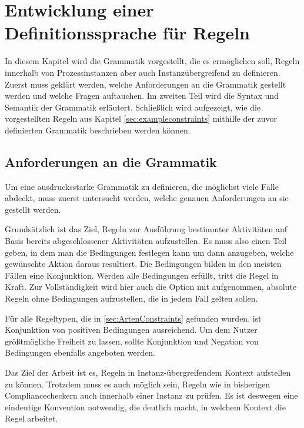 
\chapter{Entwicklung einer Definitionssprache für Regeln} %

\label{GrammatikKapitel} %


In diesem Kapitel wird die Grammatik vorgestellt, die es ermöglichen soll, Regeln innerhalb von Prozessinstanzen aber auch Instanzübergreifend zu definieren. Zuerst muss geklärt werden, welche Anforderungen an die Grammatik gestellt werden und welche Fragen auftauchen. Im zweiten Teil wird die Syntax und Semantik der Grammatik erläutert. Schließlich wird aufgezeigt, wie die vorgestellten Regeln aus Kapitel \ref{sec:exampleconstraints} mithilfe der zuvor definierten Grammatik beschrieben werden können.

%
%
\section{Anforderungen an die Grammatik}
Um eine ausdrucksstarke Grammatik zu definieren, die möglichst viele Fälle abdeckt, muss zuerst untersucht werden, welche genauen Anforderungen an sie gestellt werden.

Grundsätzlich ist das Ziel, Regeln zur Ausführung bestimmter Aktivitäten auf Basis bereits abgeschlossener Aktivitäten aufzustellen. Es muss also einen Teil geben, in dem man die Bedingungen festlegen kann um dann anzugeben, welche gewünschte Aktion daraus resultiert. Die Bedingungen bilden in den meisten Fällen eine Konjunktion. Werden alle Bedingungen erfüllt, tritt die Regel in Kraft. Zur Vollständigkeit wird hier auch die Option mit aufgenommen, absolute Regeln ohne Bedingungen aufzustellen, die in jedem Fall gelten sollen.

Für alle Regeltypen, die in \ref{sec:ArtenConstraints} gefunden wurden, ist Konjunktion von positiven Bedingungen ausreichend. Um dem Nutzer größtmögliche Freiheit zu lassen, sollte Konjunktion und Negation von Bedingungen ebenfalls angeboten werden.

Das Ziel der Arbeit ist es, Regeln in Instanz-übergreifendem Kontext aufstellen zu können. Trotzdem muss es auch möglich sein, Regeln wie in bisherigen Compliancecheckern auch innerhalb einer Instanz zu prüfen. Es ist deswegen eine eindeutige Konvention notwendig, die deutlich macht, in welchem Kontext die Regel arbeitet.

